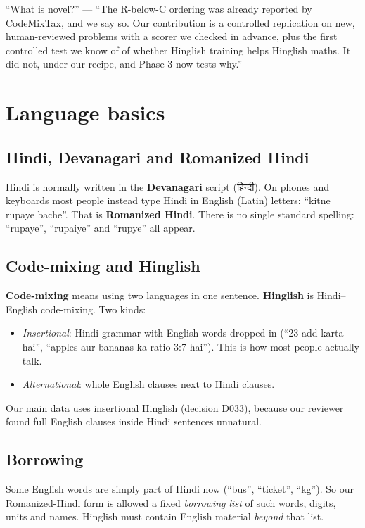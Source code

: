 \documentclass[11pt,a4paper]{article}
\begin{document}
\begin{ifasked}
``What is novel?'' --- ``The R-below-C ordering was already reported by CodeMixTax, and we say so. Our contribution is a controlled replication on new, human-reviewed problems with a scorer we checked in advance, plus the first controlled test we know of of whether Hinglish training helps Hinglish maths. It did not, under our recipe, and Phase 3 now tests why.''
\end{ifasked}

\section{Language basics}

\subsection{Hindi, Devanagari and Romanized Hindi}
Hindi is normally written in the \textbf{Devanagari} script ({\devafont हिन्दी}). On phones and keyboards most people instead type Hindi in English (Latin) letters: ``kitne rupaye bache''. That is \textbf{Romanized Hindi}. There is no single standard spelling: ``rupaye'', ``rupaiye'' and ``rupye'' all appear.

\subsection{Code-mixing and Hinglish}
\textbf{Code-mixing} means using two languages in one sentence. \textbf{Hinglish} is Hindi--English code-mixing. Two kinds:
\begin{itemize}
\item \emph{Insertional}: Hindi grammar with English words dropped in (``23 add karta hai'', ``apples aur bananas ka ratio 3:7 hai''). This is how most people actually talk.
\item \emph{Alternational}: whole English clauses next to Hindi clauses.
\end{itemize}
Our main data uses insertional Hinglish (decision D033), because our reviewer found full English clauses inside Hindi sentences unnatural.

\subsection{Borrowing}
Some English words are simply part of Hindi now (``bus'', ``ticket'', ``kg''). So our Romanized-Hindi form is allowed a fixed \emph{borrowing list} of such words, digits, units and names. Hinglish must contain English material \emph{beyond} that list.
\end{document}
